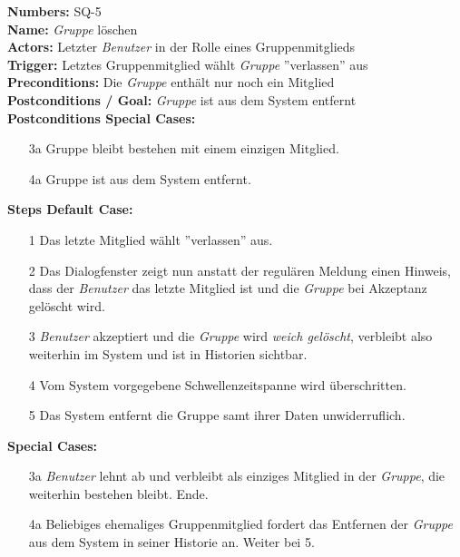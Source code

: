 \documentclass{article}
\begin{document}
\newpage
\begin{samepage}
		\textbf{Numbers:} SQ-5 \\
		\textbf{Name:} \textit{Gruppe} löschen\\
		\textbf{Actors:} Letzter \textit{Benutzer} in der Rolle eines Gruppenmitglieds\\
		\textbf{Trigger:} Letztes Gruppenmitglied wählt \textit{Gruppe} ''verlassen'' aus\\ 
		\textbf{Preconditions:} Die \textit{Gruppe} enthält nur noch ein Mitglied\\ 
		\textbf{Postconditions / Goal:} \textit{Gruppe} ist aus dem System entfernt\\
		\textbf{Postconditions Special Cases:} 
  			\begin{itemize}
				\item[3a] Gruppe bleibt bestehen mit einem einzigen Mitglied.
                    \item[4a] Gruppe ist aus dem System entfernt. 
     			\end{itemize}
		\textbf{Steps Default Case:}
		\begin{itemize}
			\item[1] Das letzte Mitglied wählt ''verlassen'' aus.
			\item[2] Das Dialogfenster zeigt nun anstatt der regulären Meldung einen Hinweis, dass der \textit{Benutzer} das letzte Mitglied ist und die \textit{Gruppe} bei Akzeptanz gelöscht wird.
			\item[3] \textit{Benutzer} akzeptiert und die \textit{Gruppe} wird \textit{weich gelöscht}, verbleibt also weiterhin im System und ist in Historien sichtbar.
			\item[4] Vom System vorgegebene Schwellenzeitspanne wird überschritten.
   			\item[5] Das System entfernt die Gruppe samt ihrer Daten unwiderruflich.
		\end{itemize}
		\textbf{Special Cases:}
		\begin{itemize}
		\item[3a] \textit{Benutzer} lehnt ab und verbleibt als einziges Mitglied in der \textit{Gruppe}, die weiterhin bestehen bleibt. Ende.
  		\item[4a] Beliebiges ehemaliges Gruppenmitglied fordert das Entfernen der \textit{Gruppe} aus dem System in seiner Historie an. Weiter bei 5.
		\end{itemize}
		\end{samepage}
\newpage
\end{document}
